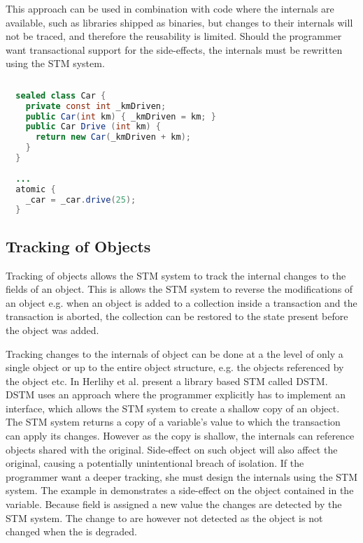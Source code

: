 This approach can be used in combination with code where the internals are available, such as libraries shipped as binaries, but changes to their internals will not be traced, and therefore the reusability is limited. Should the programmer want transactional support for the side-effects, the internals must be rewritten using the \ac{STM} system.

%
\begin{lstlisting}[label=lst:tracking_variable,
  float,
  caption={Tracking Assignment to Variables},
  language=Java,  
  showspaces=false,
  showtabs=false,
  breaklines=true,
  showstringspaces=false,
  breakatwhitespace=true,
  commentstyle=\color{greencomments},
  keywordstyle=\color{bluekeywords},
  stringstyle=\color{redstrings},
  morekeywords={atomic, retry, orElse, var, get, set, sealed}]  % Start your code-block
  
  sealed class Car {
    private const int _kmDriven;
    public Car(int km) { _kmDriven = km; }
    public Car Drive (int km) { 
      return new Car(_kmDriven + km); 
    }
  }
  
  ...
  atomic {
    _car = _car.drive(25);
  }
\end{lstlisting}
%
\subsection{Tracking of Objects}
Tracking of objects allows the \ac{STM} system to track the internal changes to the fields of an object. This is allows the \ac{STM} system to reverse the modifications of an object e.g. when an object is added to a collection inside a transaction and the transaction is aborted, the collection can be restored to the state present before the object was added.

Tracking changes to the internals of object can be done at a the level of only a single object or up to the entire object structure, e.g. the objects referenced by the object etc. In \cite{herlihy2003software} Herlihy et al. present a library based \ac{STM} called \ac{DSTM}. \ac{DSTM} uses an approach where the programmer explicitly has to implement an interface, which allows the \ac{STM} system to create a shallow copy of an object. The \ac{STM} system returns a copy of a variable's value to which the transaction can apply its changes. However as the copy is shallow, the internals can reference objects shared with the original. Side-effect on such object will also affect the original, causing a potentially unintentional breach of isolation. If the programmer want a deeper tracking, she must design the internals using the \ac{STM} system. The example in  demonstrates a side-effect on the object contained in the  variable.  Because  field is assigned a new value the changes are detected by the \ac{STM} system. The change to  are however not detected as the  object is not changed when the  is degraded.

